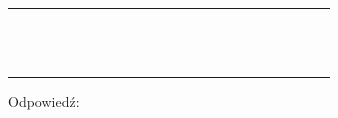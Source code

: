 \documentclass[10pt]{article}
\begin{document}
\begin{center}
\begin{tabular}{|c|c|c|c|c|c|c|c|c|c|c|c|c|c|c|c|c|c|c|c|c|c|c|}
\hline
 &  &  &  &  &  &  &  &  &  &  &  &  &  &  &  &  &  &  &  &  &  &  \\
\hline
 &  &  &  &  &  &  &  &  &  &  &  &  &  &  &  &  &  &  &  &  &  &  \\
\hline
 &  &  &  &  &  &  &  &  &  &  &  &  &  &  &  &  &  &  &  &  &  &  \\
\hline
 &  &  &  &  &  &  &  &  &  &  &  &  &  &  &  &  &  &  &  &  &  &  \\
\hline
 &  &  &  &  &  &  &  &  &  &  &  &  &  &  &  &  &  &  &  &  &  &  \\
\hline
 &  &  &  &  &  &  &  &  &  &  &  &  &  &  &  &  &  &  &  &  &  &  \\
\hline
 &  &  &  &  &  &  &  &  &  &  &  &  &  &  &  &  &  &  &  &  &  &  \\
\hline
 &  &  &  &  &  &  &  &  &  &  &  &  &  &  &  &  &  &  &  &  &  &  \\
\hline
 &  &  &  &  &  &  &  &  &  &  &  &  &  &  &  &  &  &  &  &  &  &  \\
\hline
 &  &  &  &  &  &  &  &  &  &  &  &  &  &  &  &  &  &  &  &  &  &  \\
\hline
 &  &  &  &  &  &  &  &  &  &  &  &  &  &  &  &  &  &  &  &  &  &  \\
\hline
 &  &  &  &  &  &  &  &  &  &  &  &  &  &  &  &  &  &  &  &  &  &  \\
\hline
 &  &  &  &  &  &  &  &  &  &  &  &  &  &  &  &  &  &  &  &  &  &  \\
\hline
 &  &  &  &  &  &  &  &  &  &  &  &  &  &  &  &  &  &  &  &  &  &  \\
\hline
\end{tabular}
\end{center}

Odpowiedź:
\end{document}
